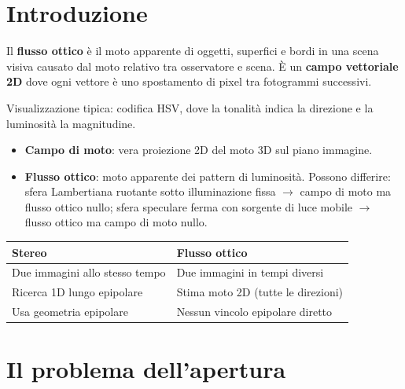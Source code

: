 \documentclass[12pt, a4paper]{report}
\begin{document}
\section{Introduzione}

\begin{defbox}
Il \textbf{flusso ottico} è il moto apparente di oggetti, superfici e bordi in
una scena visiva causato dal moto relativo tra osservatore e scena.
\`E un \textbf{campo vettoriale 2D} dove ogni vettore è uno spostamento di pixel
tra fotogrammi successivi.
\end{defbox}

Visualizzazione tipica: codifica HSV, dove la tonalità indica la direzione e la
luminosità la magnitudine.

\begin{notebox}
\begin{itemize}
  \item \textbf{Campo di moto}: vera proiezione 2D del moto 3D sul piano immagine.
  \item \textbf{Flusso ottico}: moto apparente dei pattern di luminosità.
        Possono differire: sfera Lambertiana ruotante sotto illuminazione fissa
        $\to$ campo di moto ma flusso ottico nullo; sfera speculare ferma con
        sorgente di luce mobile $\to$ flusso ottico ma campo di moto nullo.
\end{itemize}
\end{notebox}

\begin{notebox}
\begin{center}
\begin{tabular}{ll}
\toprule
\textbf{Stereo}&\textbf{Flusso ottico}\\
\midrule
Due immagini allo stesso tempo & Due immagini in tempi diversi\\
Ricerca 1D lungo epipolare & Stima moto 2D (tutte le direzioni)\\
Usa geometria epipolare & Nessun vincolo epipolare diretto\\
\bottomrule
\end{tabular}
\end{center}
\end{notebox}

\section{Il problema dell'apertura}
\end{document}
